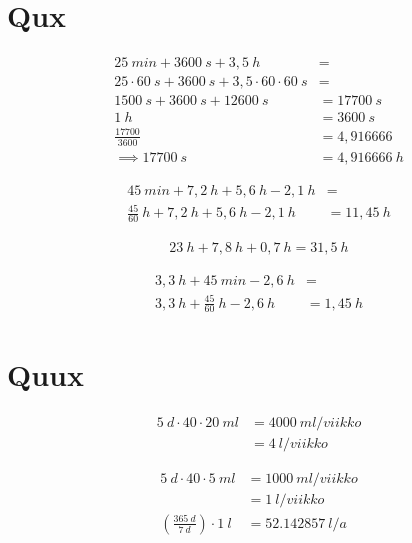 \chapter{Qux}


\begin{align*}
25\ min + 3600\ s + 3,5\ h &= \\
25 \cdot 60\ s + 3600\ s + 3,5 \cdot 60 \cdot 60\ s &= \\
1500\ s + 3600\ s + 12600\ s &= 17700\ s \\
1\ h &= 3600\ s \\
\frac{17700}{3600} &= 4,916666 \\
\implies 17700\ s &= 4,916666\ h
\end{align*}




\begin{align*}
45\ min + 7,2\ h + 5,6\ h - 2,1\ h &= \\
\frac{45}{60}\ h + 7,2\ h + 5,6\ h - 2,1\ h &= 11,45\ h
\end{align*}




\begin{align*}
23\ h + 7,8\ h + 0,7\ h = 31,5\ h
\end{align*}




\begin{align*}
3,3\ h + 45\ min - 2,6\ h &= \\
3,3\ h + \frac{45}{60}\ h - 2,6\ h &= 1,45\ h
\end{align*}


\chapter{Quux}



\begin{align*}
5\ d \cdot 40 \cdot 20\ ml &= 4000\ ml/viikko \\
                           &= 4\ l/viikko
\end{align*}




\begin{align*}
5\ d \cdot 40 \cdot 5\ ml &= 1000\ ml/viikko \\
                          &= 1\ l/viikko \\
\left ( \frac{365\ d}{7\ d} \right ) \cdot 1\ l &= 52.142857\ l/a \\
\end{align*}




